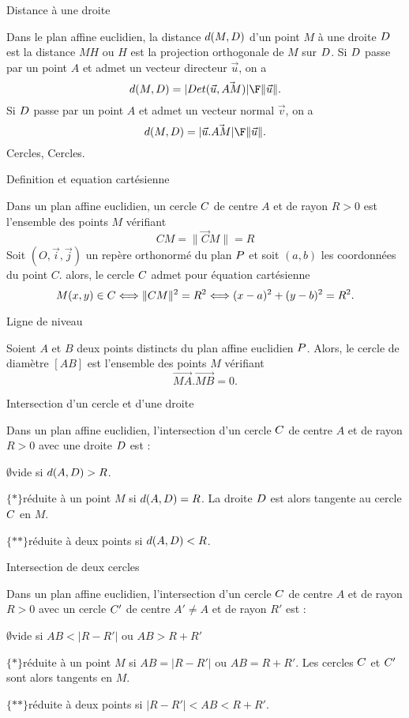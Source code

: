 \Concept [] Distance à une droite

Dans le plan affine euclidien, la distance $d(M,\sc D)$ d'un point $M$ à une droite $\sc D$ est la distance $MH$ ou $H$ est la projection orthogonale de $M$ sur $\sc D$. 
Si $\sc D$ passe par un point $A$ et admet un vecteur directeur $\vec u$, on a 
$$
d(M,\sc D)={|Det(\vec u,\vec{AM})|\F\|\vec u\|}.
$$
Si $\sc D$ passe par un point $A$ et admet un vecteur normal $\vec v$, on a 
$$
d(M,\sc D)={|\vec u.\vec{AM}|\F\|\vec u\|}.
$$
\eject
\Subsection Cercles, Cercles. 

\Concept [] Definition et equation cartésienne

\Definition []  Dans un plan affine euclidien, un cercle $\sc C$ de centre $A$ et de rayon $R>0$ est l'ensemble des points $M$ vérifiant 
$$
CM=\|\vec CM\|=R
$$
Soit $(O,\vec i,\vec j)$ un repère orthonormé du plan $\sc P$ et soit $(a,b)$ les coordonnées du point $C$. alors, le cercle $\sc C$ admet pour équation cartésienne 
$$
M(x,y)\in\sc C\Longleftrightarrow \|CM\|^2=R^2\Longleftrightarrow (x-a)^2+(y-b)^2=R^2.
$$


\Concept [] Ligne de niveau

\Propriete []  Soient $A$ et $B$ deux points distincts du plan affine euclidien $\sc P$. 
Alors, le cercle de diamètre $[AB]$ est l'ensemble des points $M$ vérifiant 
$$
\vec{MA}.\vec{MB}=0. 
$$

\Concept [] Intersection d'un cercle et d'une droite

\noindent
Dans un plan affine euclidien, l'intersection d'un cercle $\sc C$ de centre $A$ et de rayon $R>0$ avec une droite $\sc D$ est :
\medskip

\noindent
\item{$\emptyset$}vide si $d(A,\sc D)>R$. 
\medskip

\noindent
\item{$\{*\}$}réduite à un point $M$ si $d(A,\sc D)=R$. La droite $\sc D$ est alors tangente au cercle $\sc C$ en $M$. 
\medskip

\noindent
\item{$\{**\}$}réduite à deux points si $d(A,\sc D)<R$. 
\medskip


\Concept [] Intersection de deux cercles

\noindent
Dans un plan affine euclidien, l'intersection d'un cercle $\sc C$ de centre $A$ et de rayon $R>0$ avec un cercle $\sc C'$ de centre $A'\neq A$ et de rayon $R'$ est :
\medskip
\noindent
\item{$\emptyset$}vide si $AB<|R-R'|$ ou $AB>R+R'$
\medskip
\noindent
\item{$\{*\}$}réduite à un point $M$ si $AB=|R-R'|$ ou $AB=R+R'$. Les cercles $\sc C$ et $\sc C'$ sont alors tangents en $M$. 
\medskip
\noindent
\item{$\{**\}$}réduite à deux points si $|R-R'|<AB<R+R'$. 







